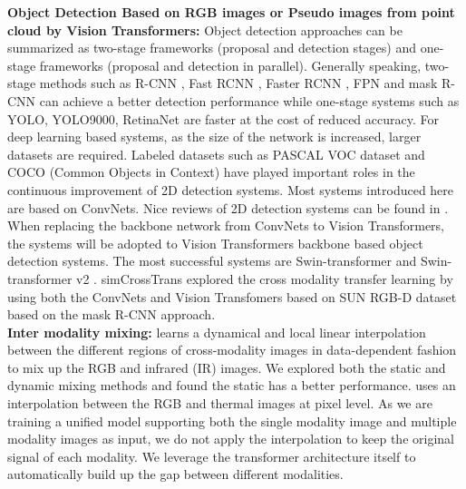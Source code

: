 \documentclass[]{modified_llncs}
\begin{document}
\textbf{Object Detection Based on RGB images or Pseudo images from point cloud by Vision Transformers: }
Object detection approaches can be summarized as two-stage frameworks (proposal and detection stages) and one-stage frameworks (proposal and detection in parallel). Generally speaking, two-stage methods such as R-CNN \cite{DBLP:journals/corr/GirshickDDM13}, Fast RCNN \cite{DBLP:conf/iccv/Girshick15}, Faster RCNN \cite{DBLP:conf/nips/RenHGS15}, FPN \cite{Lin_2017_CVPR} and mask R-CNN \cite{maskrcnn} can achieve a better detection performance while one-stage systems such as YOLO\cite{DBLP:journals/corr/RedmonDGF15}, YOLO9000\cite{DBLP:journals/corr/RedmonF16}, RetinaNet \cite{DBLP:journals/corr/abs-1708-02002} are faster at the cost of reduced accuracy. For deep learning based systems, as the size of the network is increased, larger datasets are required. Labeled datasets such as PASCAL VOC dataset \cite{pascal-voc-2012} and COCO (Common Objects in Context) \cite{DBLP:journals/corr/LinMBHPRDZ14} have played important roles in the continuous improvement of 2D detection systems. Most systems introduced here are based on ConvNets. Nice reviews of 2D detection systems can be found in \cite{DBLP:journals/corr/abs-1905-12683}. When replacing the backbone network from ConvNets to Vision Transformers, the systems will be adopted to Vision Transformers backbone based object detection systems. The most successful systems are Swin-transformer\cite{liu2021Swin} and Swin-transformer v2 \cite{DBLP:journals/corr/abs-2111-09883}. simCrossTrans\cite{simCrossTrans_cite} explored the cross modality transfer learning by using both the ConvNets and Vision Transfomers based on SUN RGB-D dataset based on the mask R-CNN \cite{maskrcnn} approach.\\

\textbf{Inter modality mixing: }
\cite{DBLP:journals/corr/abs-2203-01735} learns a dynamical and local linear interpolation between the different regions of cross-modality images in data-dependent fashion to mix up the RGB and infrared (IR) images. We explored both the static and dynamic mixing methods and found the static has a better performance. \cite{10.1145/3394171.3413821} uses an interpolation between the RGB and thermal images at pixel level. As we are training a unified model supporting both the single modality image and multiple modality images as input, we do not apply the interpolation to keep the original signal of each modality. We leverage the transformer architecture itself to automatically build up the gap between different modalities.\\
\end{document}

